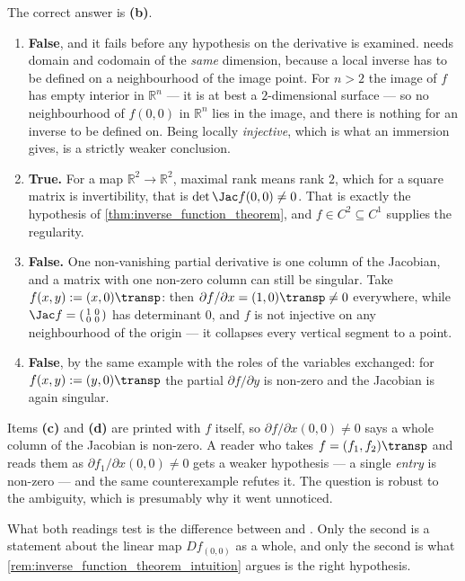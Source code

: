 \begin{exercisesolution}
\label{sol:kobel_ift_single_choice}
The correct answer is \textbf{(b)}.
\begin{enumerate}[label=\textbf{(\alph*)}]
  \item \textbf{False}, and it fails before any hypothesis on the derivative is examined.
     needs domain and codomain of the \emph{same} dimension,
    because a local inverse has to be defined on a neighbourhood of the image point. For
    $n > 2$ the image of $f$ has empty interior in $\mathbb{R}^n$ --- it is at best a
    $2$-dimensional surface --- so no neighbourhood of $f(0,0)$ in $\mathbb{R}^n$ lies in the
    image, and there is nothing for an inverse to be defined on. Being locally \emph{injective},
    which is what an immersion gives, is a strictly weaker conclusion.
  \item \textbf{True.} For a map $\mathbb{R}^2 \to \mathbb{R}^2$, maximal rank means rank $2$,
    which for a square matrix is invertibility, that is $\det\Jac f(0,0) \neq 0$. That is exactly
    the hypothesis of \cref{thm:inverse_function_theorem}, and $f \in C^2 \subseteq C^1$ supplies
    the regularity.
  \item \textbf{False.} One non-vanishing partial derivative is one column of the Jacobian, and a
    matrix with one non-zero column can still be singular. Take $f(x,y) := (x,0)\transp$: then
    $\partial f/\partial x = (1,0)\transp \neq 0$ everywhere, while
    $\Jac f = \left(\begin{smallmatrix}1&0\\0&0\end{smallmatrix}\right)$ has determinant $0$, and
    $f$ is not injective on any neighbourhood of the origin --- it collapses every vertical
    segment to a point.
  \item \textbf{False}, by the same example with the roles of the variables exchanged: for
    $f(x,y) := (y,0)\transp$ the partial $\partial f/\partial y$ is non-zero and the Jacobian is
    again singular.
\end{enumerate}
\begin{remark}
Items \textbf{(c)} and \textbf{(d)} are printed with $f$ itself, so
$\partial f/\partial x(0,0) \neq 0$ says a whole column of the Jacobian is non-zero. A reader who
takes $f = (f_1,f_2)\transp$ and reads them as $\partial f_1/\partial x(0,0) \neq 0$ gets a weaker
hypothesis --- a single \emph{entry} is non-zero --- and the same counterexample refutes it. The
question is robust to the ambiguity, which is presumably why it went unnoticed.

What both readings test is the difference between  and
. Only the second is a statement about the linear map $Df_{(0,0)}$
as a whole, and only the second is what \cref{rem:inverse_function_theorem_intuition} argues is the
right hypothesis.
\end{remark}
\end{exercisesolution}

